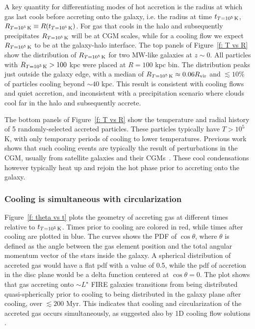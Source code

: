 \documentclass[fleqn,usenatbib]{mnras}
\newcommand{\Rcon}{R_{T=10^5\,{\rm K}}}
\newcommand{\tcon}{t_{T=10^5\,{\rm K}}}
\begin{document}
A key quantity for differentiating modes of hot accretion is the radius at which gas last cools before accreting onto the galaxy, i.e. the radius at time $\tcon$, $\Rcon \equiv R (\tcon)$.
For gas that cools in the halo and subsequently precipitates $\Rcon$ will be at CGM scales, while for a cooling flow we expect $\Rcon$ to be at the galaxy-halo interface.
The top panels of Figure~\ref{f: T vs R} show the distribution of $\Rcon$ for two MW-like galaxies at $z\sim0$.
All particles with $\Rcon>100$ kpc were placed at $R=100$ kpc bin. 
The distribution peaks just outside the galaxy edge, with a median of $\Rcon \approx 0.06 R_{\rm vir}$ and $\lesssim 10\%$ of particles cooling beyond $\sim 40$ kpc.
This result is consistent with cooling flows and quiet accretion, and inconsistent with a precipitation scenario where clouds cool far in the halo and subsequently accrete.

The bottom panels of Figure~\ref{f: T vs R} show the temperature and radial history of 5 randomly-selected accreted particles.
These particles typically have $T>10^5$ K, with only temporary periods of cooling to lower temperatures.
Previous work shows that such cooling events are typically the result of perturbations in the CGM, usually from satellite galaxies and their CGMs~\citep{Esmerian2020}.
These cool condensations however typically heat up and rejoin the hot phase prior to accreting onto the galaxy. 

\subsubsection{Cooling is simultaneous with circularization}
\label{s: characteristics -- aligns}

Figure~\ref{f: theta vs t} plots the geometry of accreting gas at different times relative to $\tcon$.
Times prior to cooling are colored in red, while times after cooling are plotted in blue.
The curves shows the PDF of $\cos \theta$, where $\theta$ is defined as the angle between the gas element position and the total angular momentum vector of the stars inside the galaxy.
A spherical distribution of accreted gas would have a flat pdf with a value of 0.5, while 
the pdf of accretion in the disc plane would be a delta function centered at $\cos\theta = 0$.
The plot shows that gas accreting onto $\sim L^\star$ FIRE galaxies transitions from being distributed quasi-spherically prior to cooling to being distributed in the galaxy plane after cooling, over $\lesssim 200$ Myr.
This indicates that cooling and circularization of the accreted gas occurs simultaneously, as suggested also by 1D cooling flow solutions \citep{Stern2020}. 
\end{document}
